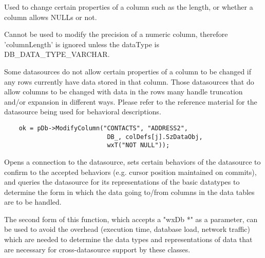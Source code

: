 Used to change certain properties of a column such as the length, or whether a column
allows NULLs or not.



Cannot be used to modify the precision of a numeric column, therefore 'columnLength'
is ignored unless the dataType is DB\_DATA\_TYPE\_VARCHAR.

Some datasources do not allow certain properties of a column to be changed if any rows
currently have data stored in that column.  Those datasources that do allow columns
to be changed with data in the rows many handle truncation and/or expansion in
different ways.  Please refer to the reference material for the datasource being
used for behavioral descriptions.


\begin{verbatim}
    ok = pDb->ModifyColumn("CONTACTS", "ADDRESS2",
                            DB_, colDefs[j].SzDataObj,
                            wxT("NOT NULL"));
\end{verbatim}


\label{wxdbopen}



Opens a connection to the datasource, sets certain behaviors of the datasource
to confirm to the accepted behaviors (e.g. cursor position maintained on
commits), and queries the datasource for its representations of the basic
datatypes to determine the form in which the data going to/from columns in
the data tables are to be handled.

The second form of this function, which accepts a "wxDb *" as a parameter,
can be used to avoid the overhead (execution time, database load, network
traffic) which are needed to determine the data types and representations
of data that are necessary for cross-datasource support by these classes.

